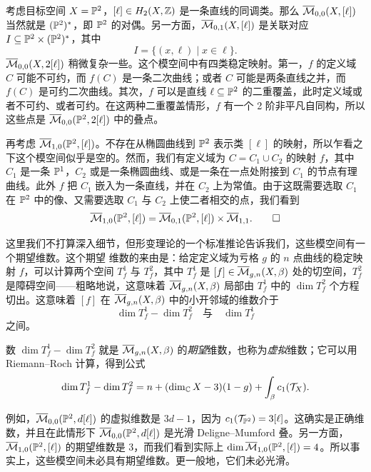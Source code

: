 \begin{examples}
考虑目标空间 $X=\mathbb{P}^2$，$[\ell]\in H_2(X,\mathbb{Z})$ 是一条直线的同调类。那么 $\overline{\mathcal{M}}_{0,0}(X,[\ell])$ 当然就是 $(\mathbb{P}^2)^{*}$，即 $\mathbb{P}^2$ 的对偶。另一方面，$\overline{\mathcal{M}}_{0,1}(X,[\ell])$ 是关联对应 $I\subseteq\mathbb{P}^2\times(\mathbb{P}^2)^{*}$，其中
\[
I=\{(x,\ell)\mid x\in\ell\}.
\]
$\overline{\mathcal{M}}_{0,0}(X,2[\ell])$ 稍微复杂一些。这个模空间中有四类稳定映射。第一，$f$ 的定义域 $C$ 可能不可约，而 $f(C)$ 是一条二次曲线；或者 $C$ 可能是两条直线之并，而 $f(C)$ 是可约二次曲线。其次，$f$ 可以是直线 $\ell\subseteq\mathbb{P}^2$ 的二重覆盖，此时定义域或者不可约、或者可约。在这两种二重覆盖情形，$f$ 有一个 2 阶非平凡自同构，所以这些点是 $\overline{\mathcal{M}}_{0,0}(\mathbb{P}^2,2[\ell])$ 中的叠点。

再考虑 $\overline{\mathcal{M}}_{1,0}(\mathbb{P}^2,[\ell])$。不存在从椭圆曲线到 $\mathbb{P}^2$ 表示类 $[\ell]$ 的映射，所以乍看之下这个模空间似乎是空的。然而，我们有定义域为 $C=C_1\cup C_2$ 的映射 $f$，其中 $C_1$ 是一条 $\mathbb{P}^1$，$C_2$ 或是一条椭圆曲线、或是一条在一点处附接到 $C_1$ 的节点有理曲线。此外 $f$ 把 $C_1$ 嵌入为一条直线，并在 $C_2$ 上为常值。由于这既需要选取 $C_1$ 在 $\mathbb{P}^2$ 中的像、又需要选取 $C_1$ 与 $C_2$ 上使二者相交的点，我们看到
\begin{equation*}
\overline{\mathcal{M}}_{1,0}(\mathbb{P}^2,[\ell])=\overline{\mathcal{M}}_{0,1}(\mathbb{P}^2,[\ell])\times\overline{\mathcal{M}}_{1,1}. \tag*{$\square$}
\end{equation*}
\end{examples}

这里我们不打算深入细节，但形变理论的一个标准推论告诉我们，这些模空间有一个期望维数。这个期望
维数的来由是：给定定义域为亏格 $g$ 的 $n$ 点曲线的稳定映射 $f$，可以计算两个空间 $T_f^1$ 与 $T_f^2$，其中 $T_f^1$ 是 $[f]\in\overline{\mathcal{M}}_{g,n}(X,\beta)$ 处的切空间，$T_f^2$ 是障碍空间——粗略地说，这意味着 $\overline{\mathcal{M}}_{g,n}(X,\beta)$ 局部由 $T_f^1$ 中的 $\dim T_f^2$ 个方程切出。这意味着 $[f]$ 在 $\overline{\mathcal{M}}_{g,n}(X,\beta)$ 中的小开邻域的维数介于
\[
\dim T_f^1-\dim T_f^2\quad\text{与}\quad\dim T_f^1
\]
之间。

数 $\dim T_f^1-\dim T_f^2$ 就是 $\overline{\mathcal{M}}_{g,n}(X,\beta)$ 的\emph{期望}维数，也称为\emph{虚拟}维数；它可以用 Riemann–Roch 计算，得到公式
\[
\dim T_f^1-\dim T_f^2=n+(\dim_{\mathbb{C}}X-3)(1-g)+\int_{\beta}c_1(\mathcal{T}_X).
\]

例如，$\overline{\mathcal{M}}_{0,0}(\mathbb{P}^2,d[\ell])$ 的虚拟维数是 $3d-1$，因为 $c_1(\mathcal{T}_{\mathbb{P}^2})=3[\ell]$。这确实是正确维数，并且在此情形下 $\overline{\mathcal{M}}_{0,0}(\mathbb{P}^2,d[\ell])$ 是光滑 Deligne–Mumford 叠。另一方面，$\overline{\mathcal{M}}_{1,0}(\mathbb{P}^2,[\ell])$ 的期望维数是 3，而我们看到实际上 $\dim\overline{\mathcal{M}}_{1,0}(\mathbb{P}^2,[\ell])=4$。所以事实上，这些模空间未必具有期望维数。更一般地，它们未必光滑。

